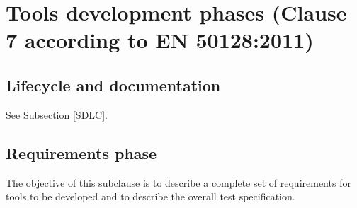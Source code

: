 \documentclass{template/openetcs_report}
\begin{document}
\section{Tools development phases (Clause 7 according to EN 50128:2011)}
\label{clause7}
\subsection{Lifecycle and documentation}
See Subsection \ref{SDLC}.


\subsection{Requirements phase}
\label{req-pha}
\begin{flushleft}
The objective of this subclause is to describe a complete set of requirements for  tools to be developed and to describe the overall test specification.
\end{flushleft}
\end{document}
